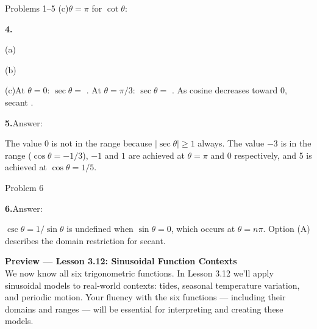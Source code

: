 \documentclass[10pt]{article}
\begin{document}
\begin{notesbox}{Problems 1--5}
\vspace{4pt}
(c)\quad $\theta = \pi$ for $\cot\theta$: 

\vspace{0.12in}
\textbf{4.}\quad

\vspace{4pt}
(a)\quad {}

\vspace{4pt}
(b)\quad {}

\vspace{4pt}
(c)\quad At $\theta = 0$: $\sec\theta = $ . At $\theta = \pi/3$: $\sec\theta = $ .
As cosine decreases toward 0, secant .

\vspace{0.12in}
\textbf{5.}\quad Answer: 

\begin{teachernote}
The value 0 is not in the range because $|\sec\theta| \geq 1$ always. The value $-3$ is in the range ($\cos\theta = -1/3$), $-1$ and $1$ are achieved at $\theta = \pi$ and $0$ respectively, and 5 is achieved at $\cos\theta = 1/5$.
\end{teachernote}

\end{notesbox}

\vspace{0.08in}

\begin{notesbox}{Problem 6}

\textbf{6.}\quad Answer: 

\begin{teachernote}
$\csc\theta = 1/\sin\theta$ is undefined when $\sin\theta = 0$, which occurs at $\theta = n\pi$. Option (A) describes the domain restriction for secant.
\end{teachernote}

\end{notesbox}

\vspace{0.08in}

\begin{tcolorbox}[colback=navylight, colframe=navy, arc=2mm,
    left=3mm, right=3mm, top=2mm, bottom=2mm]
\small\textbf{Preview --- Lesson 3.12: Sinusoidal Function Contexts}\\
We now know all six trigonometric functions. In Lesson 3.12 we'll apply
sinusoidal models to real-world contexts: tides, seasonal temperature variation,
and periodic motion. Your fluency with the six functions --- including their
domains and ranges --- will be essential for interpreting and creating
these models.
\end{tcolorbox}
\end{document}
